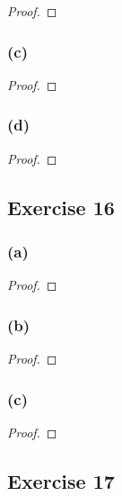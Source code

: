 \documentclass[14pt]{extarticle}
\begin{document}
\begin{proof}

\end{proof}

\subsubsection{(c)}

\begin{proof}

\end{proof}

\subsubsection{(d)}

\begin{proof}

\end{proof}

\subsection{Exercise 16}

\subsubsection{(a)}

\begin{proof}

\end{proof}

\subsubsection{(b)}

\begin{proof}

\end{proof}

\subsubsection{(c)}

\begin{proof}

\end{proof}

\subsection{Exercise 17}
\end{document}
